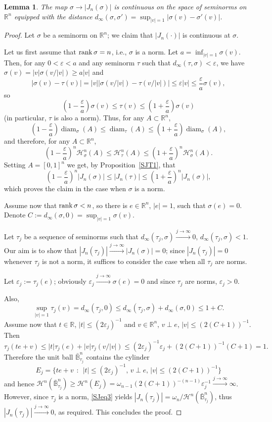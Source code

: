 \documentclass[12pt,leqno]{amsart}
\newtheorem{lemma}[theorem]{Lemma}
\theoremstyle{definition}
\newcommand{\bbbr}{\mathbb R}
\newcommand{\Bbbb}{\bar{\mathbb B}}
\newcommand{\eps}{\varepsilon}
\def\diam{\operatorname{diam}}
\def\H{{\mathcal H}}
\def\rank{{\rm rank\,}}
\numberwithin{theorem}{section} \numberwithin{equation}{section}
\begin{document}
\begin{lemma}
\label{lem: J cont}
The map $\sigma \to |J_n(\sigma)|$ is continuous on the space of seminorms on $\bbbr^n$ equipped with the distance $d_\infty(\sigma,\sigma')=\sup_{|v|=1}|\sigma(v)-\sigma'(v)|$.
\end{lemma}
\begin{proof}
Let $\sigma$ be a seminorm on $\bbbr^n$; we claim that $|J_n(\cdot)|$ is continuous at $\sigma$.

Let us first assume that $\rank\sigma=n$, i.e.,  $\sigma$ is a norm. Let $a=\inf_{|v|=1}\sigma(v)$. Then, for any $0<\eps<a$ and any seminorm $\tau$ such that $d_\infty(\tau,\sigma)<\eps$, we have $\sigma(v)=|v|\sigma(v/|v|)\geq a|v|$ and
$$
|\sigma(v)-\tau(v)|=|v|\big|\sigma(v/|v|)-\tau(v/|v|)\big|\leq \eps |v|\leq \frac{\eps}{a}\sigma(v),
$$
so
$$
\left(1-\frac{\eps}{a}\right)\sigma(v)\leq \tau(v)\leq \left(1+\frac{\eps}{a}\right)\sigma(v)
$$
(in particular, $\tau$ is also a norm). Thus, for any $A\subset\bbbr^n$,
$$
\left(1-\frac{\eps}{a}\right)\diam_\sigma(A)\leq \diam_\tau(A)\leq \left(1+\frac{\eps}{a}\right)\diam_\sigma(A),
$$
and therefore, for any $A\subset\bbbr^n$,
$$
\left(1-\frac{\eps}{a}\right)^n\H^n_\sigma(A)\leq \H^n_\tau(A)\leq \left(1+\frac{\eps}{a}\right)^n\H^n_\sigma(A).
$$
Setting $A=[0,1]^n$ we get, by Proposition~\ref{SJT1}, that
$$
\left(1-\frac{\eps}{a}\right)^n |J_n(\sigma)|\leq |J_n(\tau)|\leq \left(1+\frac{\eps}{a}\right)^n |J_n(\sigma)|,
$$
which proves the claim in the case when $\sigma$ is a norm.

Assume now that $\rank \sigma<n$, so there is $e\in\bbbr^n$, $|e|=1$, such that $\sigma(e)=0$. Denote $C:=d_\infty(\sigma,0)=\sup_{|v|=1}\sigma(v)$.

Let $\tau_j$ be a sequence of seminorms such that $d_\infty(\tau_j,\sigma)\xrightarrow{j\to\infty}0$, $d_\infty(\tau_j,\sigma)<1$.
Our aim is to show that $|J_n(\tau_j)|\xrightarrow{j\to\infty}|J_n(\sigma)|=0$; since $|J_n(\tau_j)|=0$ whenever $\tau_j$ is not a norm, it suffices to consider the case when all $\tau_j$ are norms.

Let $\eps_j:=\tau_j(e)$; obviously $\eps_j\xrightarrow{j\to\infty}\sigma(e)=0$ and since $\tau_j$ are norms, $\eps_j>0$.

Also,
$$
\sup_{|v|=1}\tau_j(v)=d_\infty(\tau_j,0)\leq d_\infty(\tau_j,\sigma)+d_\infty(\sigma,0)\leq 1+C.
$$
Assume now that $t\in\bbbr$, $|t|\leq (2\eps_j)^{-1}$ and $v\in \bbbr^n$, $v\perp e$, $|v|\leq (2(C+1))^{-1}$. Then
$$
\tau_j(te+v)\leq |t|\tau_j(e)+|v|\tau_j(v/|v|)\leq (2\eps_j)^{-1}\eps_j+(2(C+1))^{-1} (C+1)=1.
$$
Therefore the unit ball $\Bbbb^n_{\tau_j}$ contains the cylinder
$$
E_j=\{te+v~~:~~|t|\leq (2\eps_j)^{-1},\,v\perp e,\, |v|\leq (2(C+1))^{-1}\}
$$
and hence $\H^n(\Bbbb^n_{\tau_j})\geq \H^n(E_j)=\omega_{n-1}(2(C+1))^{-(n-1)} \eps_j^{-1}\xrightarrow{j\to\infty}\infty$.
However, since $\tau_j$ is a norm, \eqref{SJeq3} yields $|J_n(\tau_j)|=\omega_n/\H^n(\Bbbb^n_{\tau_j})$, thus
$|J_n(\tau_j)|\xrightarrow{j\to\infty}0$, as required. This concludes the proof.
\end{proof}
\end{document}
